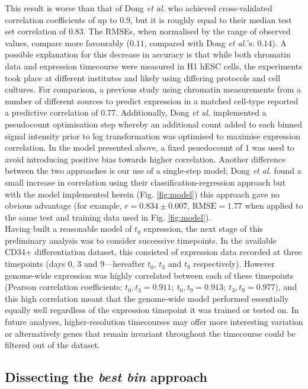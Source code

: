 \documentclass[a4paper,11pt,oneside]{book}
\begin{document}
This result is worse than that of Dong \emph{et al.}
who achieved cross-validated correlation coefficients of up to $0.9$,
but it is roughly equal to their median test set correlation of
$0.83$.\cite{Dong2012} The RMSEs, when normalised by the range of
observed values, compare more favourably ($0.11$, compared with Dong \emph{et al.}'s: $0.14$). A possible explanation for this decrease in
accuracy is that while both chromatin data and expression timecourse
were measured in H1 hESC cells, the experiments took place at
different institutes and likely using differing protocols and cell cultures. For comparison, a previous study using chromatin
measurements from a number of different sources to predict expression
in a matched cell-type reported a predictive correlation of 0.77.\cite{Karlic2010} Additionally, Dong \emph{et al.} implemented a pseudocount
optimisation step whereby an additional count added to each binned signal
intensity prior to log transformation was optimised to maximise
expression correlation. In the model presented above, a fixed
psuedocount of $1$ was used to avoid introducing positive bias towards
higher correlation. Another difference between the two approaches is
our use of a single-step model; Dong \emph{et al.} found a small
increase in correlation using their classification-regression approach
but with the model implemented herein (Fig. \ref{fig:model}) this approach gave no obvious advantage (for
example, $r
= 0.834 \pm 0.007$, $\textrm{RMSE} = 1.77$ when applied to the same test and
training data used in Fig. \ref{fig:model}). \\

Having built a reasonable model of $t_0$ expression, the next stage of
this preliminary analysis was to consider successive timepoints. In the
available CD34+ differentiation dataset, this consisted of expression
data recorded at three
timepoints (days 0, 3 and 9---hereafter $t_0$, $t_3$ and $t_9$
respectively). However genome-wide expression
was highly correlated between each of these timepoints (Pearson correlation coefficients: $t_0, t_3 = 0.911; ~t_0,t_9 =
0.913; ~t_3,t_9 = 0.977$), and this high correlation meant that the
genome-wide model performed essentially equally well regardless of the
expression timepoint it was trained or tested on. In future analyses, higher-resolution timecourses may offer
more interesting variation or alternatively genes that remain invariant
throughout the timecourse could be filtered out of the dataset. 


\subsection{Dissecting the  \emph{best bin} approach}
\end{document}
